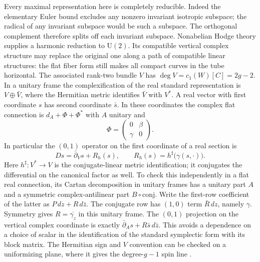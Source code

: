 Every maximal representation here is completely reducible. Indeed the elementary Euler bound excludes any nonzero invariant isotropic subspace; the radical of any invariant subspace would be such a subspace. The orthogonal complement therefore splits off each invariant subspace. Nonabelian Hodge theory supplies a harmonic reduction to \(\mathrm U(2)\). Its compatible vertical complex structure may replace the original one along a path of compatible linear structures: the flat fiber form still makes all compact curves in the tube horizontal. The associated rank-two bundle \(V\) has \(\deg V=c_1(W)[C]=2g-2\). In a unitary frame the complexification of the real standard representation is \(V\oplus\bar V\), where the Hermitian metric identifies \(\bar V\) with \(V^*\). A real vector with first coordinate \(s\) has second coordinate \(\bar s\). In these coordinates the complex flat connection is \(d_A+\Phi+\Phi^*\) with \(A\) unitary and
\[\Phi=\begin{pmatrix}0&\beta\\ \gamma&0\end{pmatrix}.\]
In particular the \((0,1)\) operator on the first coordinate of a real section is
\[D s=\bar\partial_V s+R_h(s),\qquad
 R_h(s)=h^\sharp\bigl(\gamma(s,\cdot)\bigr).\]
Here \(h^\sharp:V^*\to V\) is the conjugate-linear metric identification; it conjugates the differential on the canonical factor as well. To check this independently in a flat real connection, its Cartan decomposition in unitary frames has a unitary part \(A\) and a symmetric complex-antilinear part \(B\circ\mathrm{conj}\). Write the first-row coefficient of the latter as \(P\,dz+R\,d\bar z\). The conjugate row has \((1,0)\) term \(\bar R\,dz\), namely \(\gamma\). Symmetry gives \(R=\overline{\gamma_z}\) in this unitary frame. The \((0,1)\) projection on the vertical complex coordinate is exactly \(\bar\partial_A s+R\bar s\,d\bar z\). This avoids a dependence on a choice of scalar in the identification of the standard symplectic form with its block matrix. The Hermitian sign and \(V\) convention can be checked on a uniformizing plane, where it gives the degree-\(g-1\) spin line \cite{bgg}.

